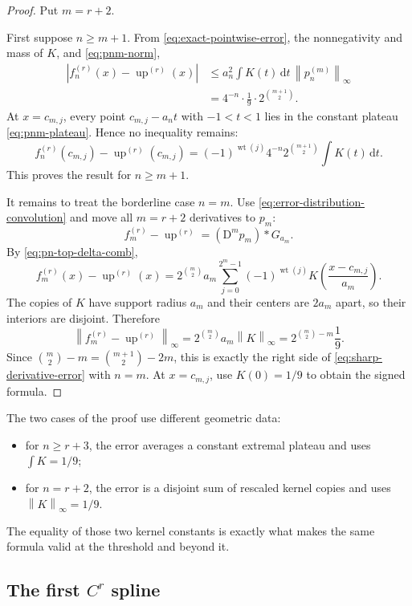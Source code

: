 \documentclass[11pt,oneside]{article}
\theoremstyle{definition}
\theoremstyle{remark}
\newcommand{\Up}{\operatorname{up}}
\newcommand{\conv}{*}
\newcommand{\wt}{\operatorname{wt}}
\newcommand{\dd}{\,\mathrm d}
\newcommand{\norm}[1]{\left\lVert#1\right\rVert}
\newcommand{\D}{\mathrm D}
\begin{document}
\begin{proof}
Put $m=r+2$.

First suppose $n\ge m+1$.  From \eqref{eq:exact-pointwise-error}, the nonnegativity and
mass of $K$, and \eqref{eq:pnm-norm},
\begin{align*}
 |f_n^{(r)}(x)-\Up^{(r)}(x)|
 &\le a_n^2\int K(t)\dd t\,\norm{p_n^{(m)}}_\infty\\
 &=4^{-n}\cdot\frac19\cdot2^{\binom{m+1}{2}}.
\end{align*}
At $x=c_{m,j}$, every point $c_{m,j}-a_nt$ with $-1<t<1$ lies in the constant plateau
\eqref{eq:pnm-plateau}.  Hence no inequality remains:
\[
 f_n^{(r)}(c_{m,j})-\Up^{(r)}(c_{m,j})
 =(-1)^{\wt(j)}4^{-n}2^{\binom{m+1}{2}}\int K(t)\dd t.
\]
This proves the result for $n\ge m+1$.

It remains to treat the borderline case $n=m$.  Use
\eqref{eq:error-distribution-convolution} and move all $m=r+2$ derivatives to $p_m$:
\[
 f_m^{(r)}-\Up^{(r)}=(\D^mp_m)\conv G_{a_m}.
\]
By \eqref{eq:pn-top-delta-comb},
\begin{equation}
 f_m^{(r)}(x)-\Up^{(r)}(x)
 =2^{\binom m2}a_m
 \sum_{j=0}^{2^m-1}(-1)^{\wt(j)}
 K\left(\frac{x-c_{m,j}}{a_m}\right).
 \label{eq:borderline-error-kernel-copies}
\end{equation}
The copies of $K$ have support radius $a_m$ and their centers are $2a_m$ apart, so their
interiors are disjoint.  Therefore
\[
 \norm{f_m^{(r)}-\Up^{(r)}}_\infty
 =2^{\binom m2}a_m\norm K_\infty
 =2^{\binom m2-m}\frac19.
\]
Since
$\binom m2-m=\binom{m+1}{2}-2m$, this is exactly the right side of
\eqref{eq:sharp-derivative-error} with $n=m$.  At $x=c_{m,j}$, use $K(0)=1/9$ to obtain
the signed formula.
\end{proof}

The two cases of the proof use different geometric data:
\begin{itemize}
\item for $n\ge r+3$, the error averages a constant extremal plateau and uses
$\int K=1/9$;
\item for $n=r+2$, the error is a disjoint sum of rescaled kernel copies and uses
$\norm K_\infty=1/9$.
\end{itemize}
The equality of those two kernel constants is exactly what makes the same formula valid at
the threshold and beyond it.

\subsection{The first \texorpdfstring{$C^r$}{C-r} spline}
\end{document}
